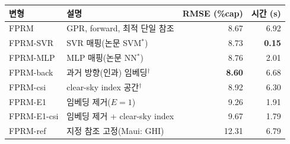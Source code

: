 \begin{tabular}{llrr}
\toprule
변형 & 설명 & RMSE (\%cap) & 시간 (s) \\
\midrule
FPRM & GPR, forward, 최적 단일 참조 & 8.67 & 6.92 \\
FPRM-SVR & SVR 매핑(논문 SVM$^*$) & 8.73 & \textbf{0.15} \\
FPRM-MLP & MLP 매핑(논문 NN$^*$) & 8.76 & 2.01 \\
FPRM-back & 과거 방향(인과) 임베딩$^\dagger$ & \textbf{8.60} & 6.68 \\
FPRM-csi & clear-sky index 공간$^\dagger$ & 8.92 & 6.30 \\
FPRM-E1 & 임베딩 제거($E{=}1$) & 9.26 & 1.91 \\
FPRM-E1-csi & 임베딩 제거 + clear-sky index & 9.67 & 1.79 \\
FPRM-ref & 지정 참조 고정(Maui: GHI) & 12.31 & 6.79 \\
\bottomrule
\end{tabular}
